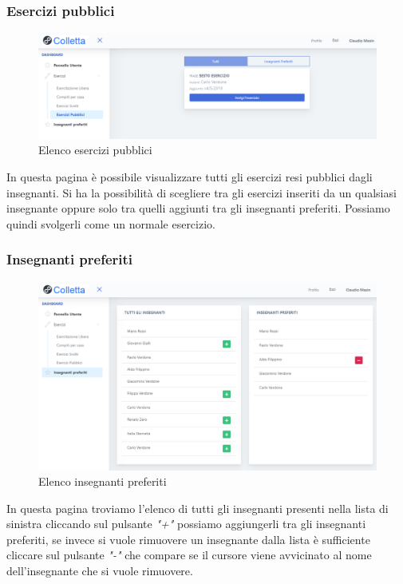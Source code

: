            \subsubsection{Esercizi pubblici}
        	\begin{figure}[H]
            	\centering
            	\includegraphics[width=17cm]{sez/img/studente/esercizipubblici.PNG} 
            	\caption{Elenco esercizi pubblici}\label{fig:1}
        	\end{figure}
        	In questa pagina è possibile visualizzare tutti gli esercizi resi pubblici dagli insegnanti. Si ha la possibilità  di scegliere tra gli esercizi inseriti da un qualsiasi insegnante oppure solo tra quelli aggiunti tra gli insegnanti preferiti. Possiamo quindi svolgerli come un normale esercizio. 
        
        
        
\subsubsection{Insegnanti preferiti}
        	\begin{figure}[H]
            	\centering
            	\includegraphics[width=17cm]{sez/img/studente/insegnantepreferito.png} 
            	\caption{Elenco insegnanti preferiti}\label{fig:1}
        	\end{figure}        
        In questa pagina troviamo l'elenco di tutti gli insegnanti presenti nella lista di sinistra cliccando sul pulsante \textit{"+"} possiamo aggiungerli tra gli insegnanti preferiti, se invece si vuole rimuovere un insegnante dalla lista è sufficiente cliccare sul pulsante \textit{"-"} che compare se il cursore viene avvicinato al nome dell'insegnante che si vuole rimuovere.
        
